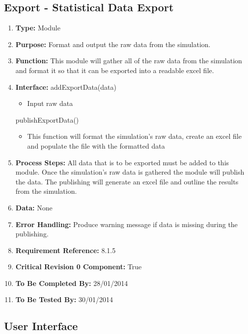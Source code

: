 \documentclass[paper=letter, fontsize=10pt]{scrartcl}
\numberwithin{equation}{section}		%
\numberwithin{figure}{section}			%
\numberwithin{table}{section}				%
\begin{document}
\subsection{Export - Statistical Data Export}
\begin{enumerate}[]
	\item \textbf{Type:} Module
	\item \textbf{Purpose:} Format and output the raw data from the simulation.
	\item \textbf{Function:} This module will gather all of the raw data from the simulation and format it  so that it can be exported into a readable excel file.
	\item \textbf{Interface:}
	addExportData(data)
	\begin{itemize}
		\item Input raw data
	\end{itemize}
	publishExportData()
	\begin{itemize}
		\item This function will format the simulation's raw data, create an excel file and populate the file with the formatted data
	\end{itemize}
	\item \textbf{Process Steps:} All data that is to be exported must be added to this module.  Once the simulation's raw data is gathered the module will publish the data.  The publishing will generate an excel file and outline the results from the simulation.
	\item \textbf{Data:} None
	\item \textbf{Error Handling:}  Produce warning message if data is missing during the publishing.
	\item \textbf{Requirement Reference:} 8.1.5
	\item \textbf{Critical Revision 0 Component:} True
	\item \textbf{To Be Completed By:} 28/01/2014
	\item \textbf{To Be Tested By:} 30/01/2014
\end{enumerate}

\subsection{User Interface}
\end{document}
